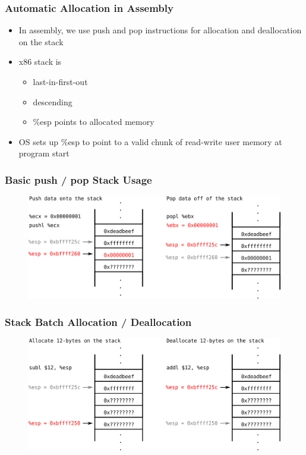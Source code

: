 \documentclass[11pt,xcolor=dvipsnames]{beamer}
\newcommand{\mvs}{\vspace{-0.95em}}
\begin{document}
\begin{frame}[fragile,t]
\frametitle{Automatic Allocation in Assembly}
\begin{itemize}
  \item In assembly, we use {\ttfamily push} and {\ttfamily pop} instructions for allocation and deallocation on the stack
  \item x86 stack is 
  \begin{itemize}
    \item last-in-first-out
    \item descending
    \item {\ttfamily \%esp} points to allocated memory
  \end{itemize}
  \item OS sets up {\ttfamily \%esp} to point to a valid chunk of read-write user memory at program start
\end{itemize}
\end{frame}

\begin{frame}[fragile]
\frametitle{Basic {\ttfamily push} / {\ttfamily pop} Stack Usage}
\mvs
\begin{figure}
\centering
\includegraphics[width=\textwidth]{figures/stackpushpop.png}
\end{figure}
\end{frame}

\begin{frame}[fragile]
\frametitle{Stack Batch Allocation / Deallocation}
\mvs
\begin{figure}
\centering
\includegraphics[width=\textwidth]{figures/stackalloc.png}
\end{figure}
\end{frame}
\end{document}
